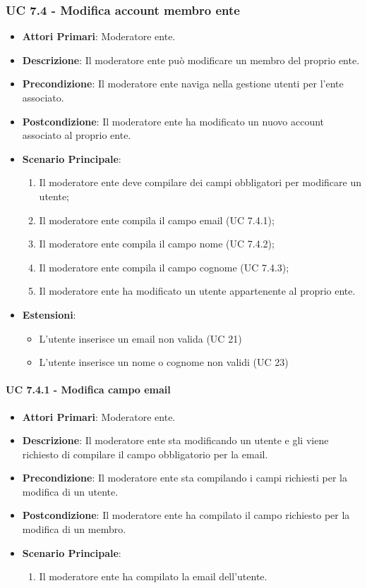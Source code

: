 			\subsubsection{UC 7.4 - Modifica account membro ente}
			\begin{itemize}
				\item \textbf{Attori Primari}: Moderatore ente.
				\item \textbf{Descrizione}: Il moderatore ente può modificare un membro del proprio ente.
				\item \textbf{Precondizione}: Il moderatore ente naviga nella gestione utenti per l'ente associato.
				\item \textbf{Postcondizione}: Il moderatore ente ha modificato un nuovo account associato al proprio ente.
				\item \textbf{Scenario Principale}:
				\begin{enumerate}
					\item{Il moderatore ente deve compilare dei campi obbligatori per modificare un utente;}
					\item{Il moderatore ente compila il campo email (UC 7.4.1);}
					\item{Il moderatore ente compila il campo nome (UC 7.4.2);}
					\item{Il moderatore ente compila il campo cognome (UC 7.4.3);}
					\item{Il moderatore ente ha modificato un utente appartenente al proprio ente.}
				\end{enumerate}	
				\item \textbf{Estensioni}:
				\begin{itemize}
					\item L'utente inserisce un email non valida (UC 21)
					\item L'utente inserisce un nome o cognome non validi (UC 23)
				\end{itemize}
			\end{itemize}
			
			\paragraph{UC 7.4.1 - Modifica campo email}
			\begin{itemize}
				\item \textbf{Attori Primari}: Moderatore ente.
				\item \textbf{Descrizione}: Il moderatore ente sta modificando un utente e gli viene richiesto di compilare il campo obbligatorio per la email.
				\item \textbf{Precondizione}: Il moderatore ente sta compilando i campi richiesti per la modifica di un utente.
				\item \textbf{Postcondizione}: Il moderatore ente ha compilato il campo richiesto per la modifica di un membro.
				\item \textbf{Scenario Principale}:
				\begin{enumerate}
					\item{Il moderatore ente ha compilato la email dell'utente.}
				\end{enumerate}	
			\end{itemize}

